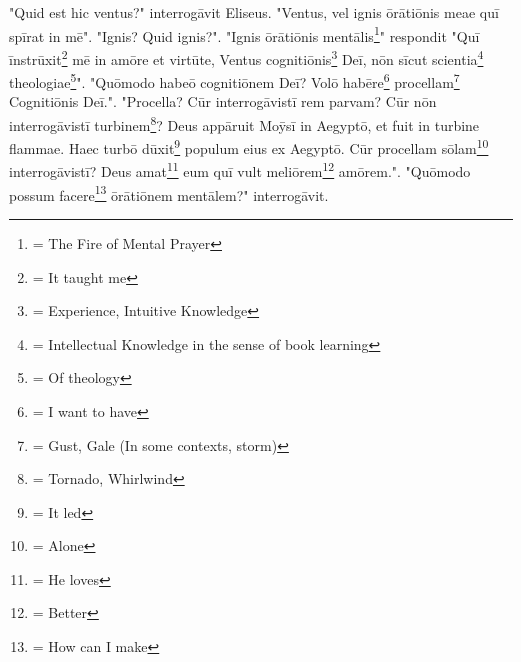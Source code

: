 "Quid est hic ventus?" interrogāvit Eliseus. "Ventus, vel ignis ōrātiōnis meae quī spīrat in mē". "Ignis? Quid ignis?". "Ignis ōrātiōnis mentālis\footnote{\textbf{} = The Fire of Mental Prayer}" respondit "Quī īnstrūxit\footnote{\textbf{} = It taught me} mē in amōre et virtūte, Ventus cognitiōnis\footnote{\textbf{} = Experience, Intuitive Knowledge} Deī, nōn sīcut scientia\footnote{\textbf{} = Intellectual Knowledge in the sense of book learning} theologiae\footnote{\textbf{} = Of theology}". "Quōmodo habeō cognitiōnem Deī? Volō habēre\footnote{\textbf{} = I want to have} procellam\footnote{\textbf{} = Gust, Gale (In some contexts, storm) } Cognitiōnis Deī.". "Procella? Cūr interrogāvistī rem parvam? Cūr nōn interrogāvistī turbinem\footnote{\textbf{} = Tornado, Whirlwind}? Deus appāruit Moȳsī in Aegyptō, et fuit in turbine flammae. Haec turbō dūxit\footnote{\textbf{} = It led} populum eius ex Aegyptō. Cūr procellam sōlam\footnote{\textbf{} = Alone} interrogāvistī? Deus amat\footnote{\textbf{} = He loves} eum quī vult meliōrem\footnote{\textbf{} = Better} amōrem.". "Quōmodo possum facere\footnote{\textbf{} = How can I make} ōrātiōnem mentālem?" interrogāvit. 

